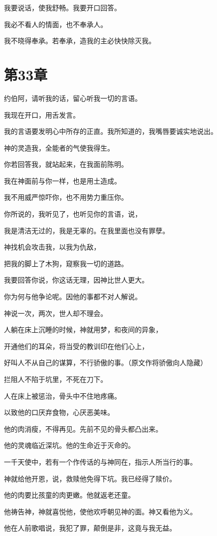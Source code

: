 \documentclass[12pt,oneside]{book}
\begin{document}
我要说话，使我舒畅。我要开口回答。

我必不看人的情面，也不奉承人。

我不晓得奉承。若奉承，造我的主必快快除灭我。


\chapter{第33章}
约伯阿，请听我的话，留心听我一切的言语。

我现在开口，用舌发言。

我的言语要发明心中所存的正直。我所知道的，我嘴唇要诚实地说出。

神的灵造我，全能者的气使我得生。

你若回答我，就站起来，在我面前陈明。

我在神面前与你一样，也是用土造成。

我不用威严惊吓你，也不用势力重压你。

你所说的，我听见了，也听见你的言语，说，

我是清洁无过的，我是无辜的。在我里面也没有罪孽。

神找机会攻击我，以我为仇敌，

把我的脚上了木狗，窥察我一切的道路。

我要回答你说，你这话无理，因神比世人更大。

你为何与他争论呢。因他的事都不对人解说。

神说一次，两次，世人却不理会。

人躺在床上沉睡的时候，神就用梦，和夜间的异象，

开通他们的耳朵，将当受的教训印在他们心上，

好叫人不从自己的谋算，不行骄傲的事。（原文作将骄傲向人隐藏）

拦阻人不陷于坑里，不死在刀下。

人在床上被惩治，骨头中不住地疼痛。

以致他的口厌弃食物，心厌恶美味。

他的肉消瘦，不得再见。先前不见的骨头都凸出来。

他的灵魂临近深坑。他的生命近于灭命的。

一千天使中，若有一个作传话的与神同在，指示人所当行的事。

神就给他开恩，说，救赎他免得下坑。我已经得了赎价。

他的肉要比孩童的肉更嫩。他就返老还童。

他祷告神，神就喜悦他，使他欢呼朝见神的面。神又看他为义。

他在人前歌唱说，我犯了罪，颠倒是非，这竟与我无益。
\end{document}
